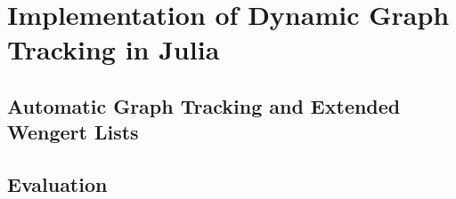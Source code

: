 \chapter{Implementation of Dynamic Graph Tracking in Julia}
\label{cha:impl-dynam-graph}


\section{Automatic Graph Tracking and Extended Wengert Lists}
\label{sec:autom-graph-track}

\section{Evaluation}
\label{sec:irtracker-eval}

